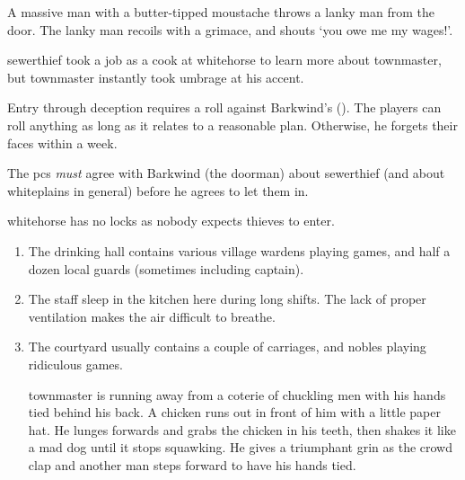 \begin{multicols}{2}

\begin{boxtext}

  A massive man with a butter-tipped moustache throws a lanky man from the door.
  The lanky man recoils with a grimace, and shouts `you owe me my wages!'.

\end{boxtext}


\begin{exampletext}
  \Gls{sewerthief} took a job as a cook at \gls{whitehorse} to learn more about \gls{townmaster}, but \gls{townmaster} instantly took umbrage at his  accent.
\end{exampletext}


Entry through deception requires a roll against Barkwind's  (\tn).
The players can roll anything as long as it relates to a reasonable plan.
Otherwise, he forgets their faces within a week.

The \glspl{pc} \emph{must} agree with Barkwind (the doorman) about \gls{sewerthief} (and about \gls{whiteplains} in general) before he agrees to let them in.

\Gls{whitehorse} has no locks as nobody expects thieves to enter.
 
\begin{enumerate}
  \item
  The drinking hall contains various \gls{village} \glspl{warden} playing games, and half a dozen local guards (sometimes including \gls{captain}).
  \label{horseHall}
  \item
  \label{horseKitch}
  The staff sleep in the kitchen here during long shifts.
  The lack of proper ventilation makes the air difficult to breathe.
  \item
  \label{horseYard}
  The courtyard usually contains a couple of carriages, and nobles playing ridiculous games.
  \begin{boxtext}
    \Gls{townmaster} is running away from a coterie of chuckling men with his hands tied behind his back.
     A chicken runs out in front of him with a little paper hat.
     He lunges forwards and grabs the chicken in his teeth, then shakes it like a mad dog until it stops squawking.
     He gives a triumphant grin as the crowd clap and another man steps forward to have his hands tied.
  \end{boxtext}


\end{enumerate}
\end{multicols}
